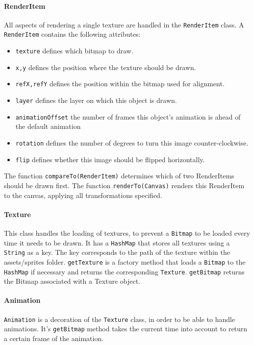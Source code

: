 \documentclass[../main.tex]{subfiles}
\begin{document}
		\paragraph{RenderItem} All aspects of rendering a single texture are handled in the \texttt{RenderItem} class. A \texttt{RenderItem} contains the following attributes: 
		\begin{itemize}
			\item \texttt{texture} defines which bitmap to draw.
			\item \texttt{x,y} defines the position where the texture should be drawn.
			\item \texttt{refX,refY} defines the position within the bitmap used for alignment.
			\item \texttt{layer} defines the layer on which this object is drawn.
			\item \texttt{animationOffset} the number of frames this object's animation is ahead of the default animation
			\item \texttt{rotation} defines the number of degrees to turn this image counter-clockwise.
			\item \texttt{flip} defines whether this image should be flipped horizontally.
		\end{itemize}
		The function \texttt{compareTo(RenderItem)} determines which of two RenderItems should be drawn first. The function \texttt{renderTo(Canvas)} renders this RenderItem to the canvas, applying all transformations specified.

		\paragraph{Texture} This class handles the loading of textures, to prevent a \texttt{Bitmap} to be loaded every time it needs to be drawn. It has a \texttt{HashMap} that stores all textures using a \texttt{String} as a key. The key corresponds to the path of the texture within the assets/sprites folder. \texttt{getTexture} is a factory method that loads a \texttt{Bitmap} to the \texttt{HashMap} if necessary and returns the corresponding \texttt{Texture}. \texttt{getBitmap} returns the Bitmap associated with a Texture object.

		\paragraph{Animation} \texttt{Animation} is a decoration of the \texttt{Texture} class, in order to be able to handle animations. It's \texttt{getBitmap} method takes the current time into account to return a certain frame of the animation.
\end{document}
